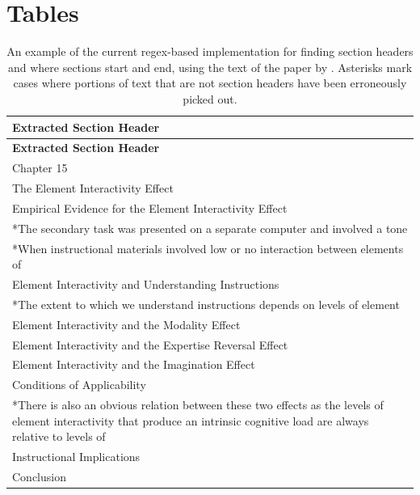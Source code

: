 \documentclass[12pt]{article}
\theoremstyle{grammarstyle}
\begin{document}
\section{Tables}
\begin{longtable}{|p{13cm}|}
    \caption{An example of the current regex-based implementation for finding section headers and where sections start and end, using the text of the paper by \cite{sweller2011element}. Asterisks mark cases where portions of text that are not section headers have been erroneously picked out.}
    \label{tab:section_finding_example} \\
    \hline
    \textbf{Extracted Section Header} \\
    \hline
    \endfirsthead
    
    \hline
    \textbf{Extracted Section Header} \\
    \hline
    \endhead
    
    Chapter 15 \\
    The Element Interactivity Effect \\ 
    \hline
    Empirical Evidence for the Element Interactivity Effect \\ \hline
    *The secondary task was presented on a separate computer and involved a tone \\ 
    \hline
    *When instructional materials involved low or no interaction between elements of \\ 
    \hline
    Element Interactivity and Understanding Instructions \\ 
    \hline
    *The extent to which we understand instructions depends on levels of element \\ 
    \hline
    Element Interactivity and the Modality Effect \\ 
    \hline
    Element Interactivity and the Expertise Reversal Effect \\ 
    \hline
    Element Interactivity and the Imagination Effect \\ 
    \hline
    Conditions of Applicability \\ 
    \hline
    *There is also an obvious relation between these two effects as the levels of element
    interactivity that produce an intrinsic cognitive load are always relative to levels of \\ 
    \hline
    Instructional Implications \\ 
    \hline
    Conclusion \\ 
    \hline
\end{longtable}
\end{document}
